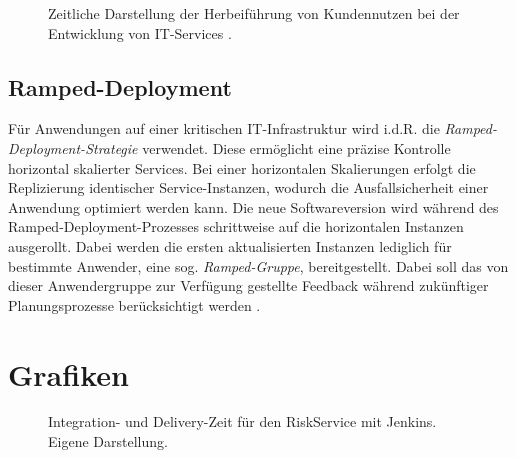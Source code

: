 \begin{center}
	\begin{figure}[H]
		\centering
		\caption[Zeitliche Darstellung der Herbeiführung von Kundennutzen bei der Entwicklung von IT-Services]{Zeitliche Darstellung der Herbeiführung von Kundennutzen bei der Entwicklung von IT-Services \cite[9]{Halstenberg.2020}.}
		\label{fig:TTM}
	\end{figure}
\end{center}
\vspace*{-15mm}


\subsection{Ramped-Deployment}
Für Anwendungen auf einer kritischen IT-Infrastruktur wird i.d.R. die \textit{Ramped-Deployment-Strategie} verwendet. Diese ermöglicht eine präzise Kontrolle horizontal skalierter Services. Bei einer horizontalen Skalierungen erfolgt die Replizierung identischer Service-Instanzen, wodurch die Ausfallsicherheit einer Anwendung optimiert werden kann. Die neue Softwareversion wird während des Ramped-Deployment-Prozesses schrittweise auf die horizontalen Instanzen ausgerollt. Dabei werden die ersten aktualisierten Instanzen lediglich für bestimmte Anwender, eine sog. \textit{Ramped-Gruppe}, bereitgestellt. Dabei soll das von dieser Anwendergruppe zur Verfügung gestellte Feedback während zukünftiger Planungsprozesse berücksichtigt werden \cite{Ugochi.20220503}.



\newpage
\section{Grafiken}
\begin{center}
	\begin{figure}[H]
		\centering
		\caption[]{Integration- und Delivery-Zeit für den RiskService mit Jenkins. Eigene Darstellung.}
		\label{fig:JP_Risk}
	\end{figure}
\end{center}

